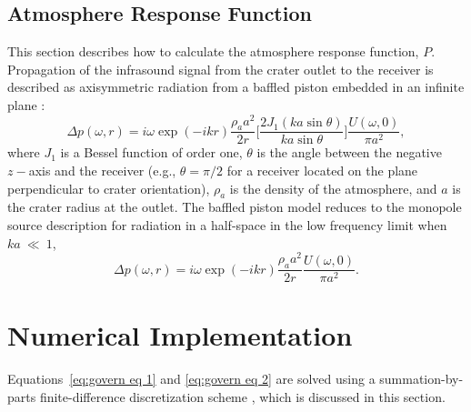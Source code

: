 \documentclass[10pt]{article}
\begin{document}
\subsection{Atmosphere Response Function}
This section describes how to calculate the atmosphere response function, $P$. Propagation of the infrasound signal from the crater outlet to the receiver is described as axisymmetric radiation from a baffled piston embedded in an infinite plane \citep{Rossing2004}:
\begin{equation}
\Delta p(\omega,r) = i \omega \exp(-ikr) \frac{\rho_a a^2}{2r} \bigg[ \frac{2J_1 (ka \sin \theta)}{ka \sin \theta} \bigg] \frac{U(\omega,0)}{\pi a^2},
\label{eq:acoustic radiation}
\end{equation}
where $J_1$ is a Bessel function of order one, $\theta$ is the angle between the negative $z-$axis and the receiver (e.g., $\theta=\pi/2$ for a receiver located on the plane perpendicular to crater orientation), $\rho_a$ is the density of the atmosphere, and $a$ is the crater radius at the outlet. The baffled piston model reduces to the monopole source description \cite[e.g.,][]{Woulff1976,Johnson2014} for radiation in a half-space in the low frequency limit when $ka~\ll~1$,
\begin{equation}
\Delta p(\omega, r) = i \omega \exp(-ikr) \frac{\rho_a a^2}{2r}\frac{U(\omega,0)}{\pi a^2}.
\label{eq:acoustic radiation monopole}
\end{equation}

\section{Numerical Implementation}
Equations~\ref{eq:govern eq 1} and \ref{eq:govern eq 2} are solved using a summation-by-parts finite-difference discretization scheme \citep{DelReyFernandez2014a,Svard2014}, which is discussed in this section. 
\end{document}

